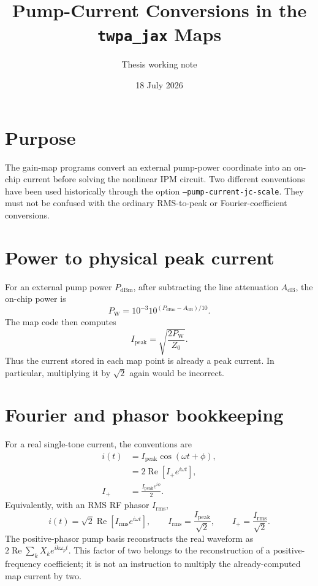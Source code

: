 \documentclass[11pt,a4paper]{article}
\title{Pump-Current Conversions in the \texttt{twpa\_jax} Maps}
\author{Thesis working note}
\date{18 July 2026}
\begin{document}
\maketitle

\section{Purpose}

The gain-map programs convert an external pump-power coordinate into an
on-chip current before solving the nonlinear IPM circuit.  Two different
conventions have been used historically through the option
\texttt{--pump-current-jc-scale}.  They must not be confused with the ordinary
RMS-to-peak or Fourier-coefficient conversions.

\section{Power to physical peak current}

For an external pump power $P_{\mathrm{dBm}}$, after subtracting the line
attenuation $A_{\mathrm{dB}}$, the on-chip power is
\begin{equation}
  P_{\mathrm{W}}
  =10^{-3}10^{(P_{\mathrm{dBm}}-A_{\mathrm{dB}})/10}.
\end{equation}
The map code then computes
\begin{equation}
  I_{\mathrm{peak}}
  =\sqrt{\frac{2P_{\mathrm{W}}}{Z_0}}.
  \label{eq:peak-current}
\end{equation}
Thus the current stored in each map point is already a peak current.  In
particular, multiplying it by $\sqrt{2}$ again would be incorrect.

\section{Fourier and phasor bookkeeping}

For a real single-tone current, the conventions are
\begin{align}
  i(t) &= I_{\mathrm{peak}}\cos(\omega t+\phi),\\
       &= 2\operatorname{Re}\!\left[I_+e^{i\omega t}\right],\\
  I_+ &= \frac{I_{\mathrm{peak}}e^{i\phi}}{2}.
\end{align}
Equivalently, with an RMS RF phasor $I_{\mathrm{rms}}$,
\begin{equation}
  i(t)=\sqrt{2}\operatorname{Re}\!\left[I_{\mathrm{rms}}e^{i\omega t}\right],
  \qquad I_{\mathrm{rms}}=\frac{I_{\mathrm{peak}}}{\sqrt{2}},
  \qquad I_+=\frac{I_{\mathrm{rms}}}{\sqrt{2}}.
\end{equation}
The positive-phasor pump basis reconstructs the real waveform as
$2\operatorname{Re}\sum_k X_k e^{ik\omega_pt}$.  This factor of two belongs
to the reconstruction of a positive-frequency coefficient; it is not an
instruction to multiply the already-computed map current by two.
\end{document}
